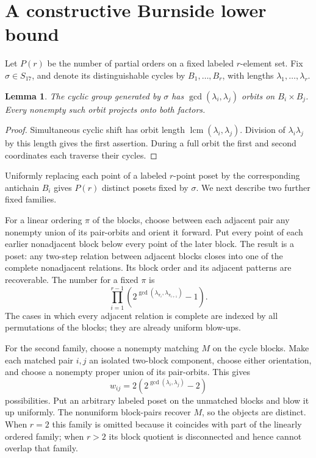 \documentclass[11pt]{amsart}
\newtheorem{lemma}[theorem]{Lemma}
\theoremstyle{definition}
\begin{document}
\section{A constructive Burnside lower bound}

Let $P(r)$ be the number of partial orders on a fixed labeled $r$-element
set.  Fix $\sigma\in S_{17}$, and denote its distinguishable cycles by
$B_1,\ldots,B_r$, with lengths $\lambda_1,\ldots,\lambda_r$.

\begin{lemma}\label{lem:pairorbits}
The cyclic group generated by $\sigma$ has
$\gcd(\lambda_i,\lambda_j)$ orbits on $B_i\times B_j$.
Every nonempty such orbit projects onto both factors.
\end{lemma}

\begin{proof}
Simultaneous cyclic shift has orbit length
$\operatorname{lcm}(\lambda_i,\lambda_j)$.  Division of
$\lambda_i\lambda_j$ by this length gives the first assertion.  During a full
orbit the first and second coordinates each traverse their cycles.
\end{proof}

Uniformly replacing each point of a labeled $r$-point poset by the
corresponding antichain $B_i$ gives $P(r)$ distinct posets fixed by $\sigma$.
We next describe two further fixed families.

For a linear ordering $\pi$ of the blocks, choose between each adjacent pair
any nonempty union of its pair-orbits and orient it forward.  Put every point
of each earlier nonadjacent block below every point of the later block.  The
result is a poset: any two-step relation between adjacent blocks closes into
one of the complete nonadjacent relations.  Its block order and its adjacent
patterns are recoverable.  The number for a fixed $\pi$ is
\[
\prod_{i=1}^{r-1}
\left(2^{\gcd(\lambda_{\pi_i},\lambda_{\pi_{i+1}})}-1\right).
\]
The cases in which every adjacent relation is complete are indexed by all
permutations of the blocks; they are already uniform blow-ups.

For the second family, choose a nonempty matching $M$ on the cycle blocks.
Make each matched pair $i,j$ an isolated two-block component, choose either
orientation, and choose a nonempty proper union of its pair-orbits.  This
gives
\[
w_{ij}=2\left(2^{\gcd(\lambda_i,\lambda_j)}-2\right)
\]
possibilities.  Put an arbitrary labeled poset on the unmatched blocks and
blow it up uniformly.  The nonuniform block-pairs recover $M$, so the objects
are distinct.  When $r=2$ this family is omitted because it coincides with
part of the linearly ordered family; when $r>2$ its block quotient is
disconnected and hence cannot overlap that family.
\end{document}
